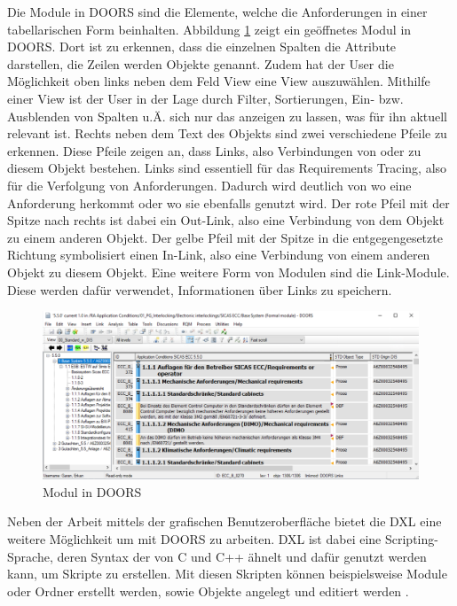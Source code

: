 Die Module in DOORS sind die Elemente, welche die Anforderungen in einer tabellarischen Form beinhalten. Abbildung \ref*{fig:Doors Modul} zeigt ein geöffnetes Modul in DOORS. Dort ist zu erkennen,
dass die einzelnen Spalten die Attribute darstellen, die Zeilen werden Objekte genannt. Zudem hat der User die Möglichkeit oben links neben dem Feld \glqq View\grqq{} eine View auszuwählen. Mithilfe einer View 
ist der User in der Lage durch Filter, Sortierungen, Ein- bzw. Ausblenden von Spalten u.Ä. sich nur das anzeigen zu lassen, was für ihn aktuell relevant ist. Rechts neben dem Text des Objekts sind 
zwei verschiedene Pfeile zu erkennen. Diese Pfeile zeigen an, dass Links, also Verbindungen von oder zu diesem Objekt bestehen. Links sind essentiell für das Requirements Tracing, also für die
Verfolgung von Anforderungen. Dadurch wird deutlich von wo eine Anforderung herkommt oder wo sie ebenfalls genutzt wird. Der rote Pfeil mit der Spitze nach rechts ist dabei ein Out-Link, also eine
Verbindung von dem Objekt zu einem anderen Objekt. Der gelbe Pfeil mit der Spitze in die entgegengesetzte Richtung symbolisiert einen In-Link, also eine Verbindung von einem anderen Objekt zu diesem 
Objekt. Eine weitere Form von Modulen sind die Link-Module. Diese werden dafür verwendet, Informationen über Links zu speichern. 

\begin{figure}[H]
    \centering
    \includegraphics[width = \textwidth]{abbildungen/Modul in Doors.PNG}
    \caption{Modul in DOORS}
    \label{fig:Doors Modul}
\end{figure}

Neben der Arbeit mittels der grafischen Benutzeroberfläche bietet die \ac*{DXL} eine weitere Möglichkeit um mit DOORS zu arbeiten. \ac*{DXL} ist dabei eine Scripting-Sprache, deren
Syntax der von C und C++ ähnelt und dafür genutzt werden kann, um Skripte zu erstellen. Mit diesen Skripten können beispielsweise Module oder Ordner erstellt werden, sowie Objekte angelegt und 
editiert werden \cite[]{q7}. 